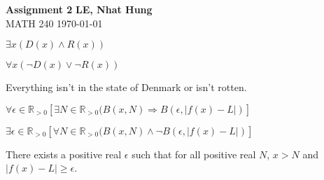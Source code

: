 \documentclass[a4paper, 11pt]{article}
\begin{document}
\noindent
\large\textbf{Assignment 2} \hfill \textbf{LE, Nhat Hung} \\
\normalsize MATH 240 \hfill \today

\begin{myEnumerate}
	\item
	\begin{myEnumerate}
    	\item
    	\begin{myEnumerate}
        	\item $\exists{x}(D(x)\wedge R(x))$
        	\item $\forall{x}(\neg D(x)\vee \neg R(x))$
        	\item Everything isn't in the state of Denmark or isn't rotten.
        \end{myEnumerate}
    	\item
    	\begin{myEnumerate}
        	\item $\forall{\epsilon}\in \mathbb{R}_{>0}[\exists{N}\in \mathbb{R}_{>0}(B(x,N)\Rightarrow B(\epsilon, |f(x)-L|)]$
        	\item $\exists{\epsilon}\in \mathbb{R}_{>0}[\forall{N}\in \mathbb{R}_{>0}(B(x,N)\wedge \neg B(\epsilon, |f(x)-L|)]$
        	\item There exists a positive real $\epsilon$ such that for all positive real $N$, $x>N$ and $|f(x)-L|\ge \epsilon$. \\
        \end{myEnumerate}
    \end{myEnumerate}


\end{myEnumerate}
\end{document}
